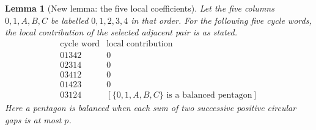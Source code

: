 \documentclass[11pt,oneside]{report}
\newtheorem{lemma}[theorem]{Lemma}
\theoremstyle{definition}
\numberwithin{equation}{section}
\begin{document}
\begin{lemma}[New lemma: the five local coefficients]
\label{J21:lem:m4-B-unit-table}
Let the five columns $0,1,A,B,C$ be labelled $0,1,2,3,4$ in that
order. For the following five cycle words, the local contribution of
the selected adjacent pair is as stated.
\[
\begin{array}{c|c}
 \text{cycle word}&\text{local contribution}\\\hline
 01342&0\\
 02314&0\\
 03412&0\\
 01423&0\\
 03124&[\{0,1,A,B,C\}\text{ is a balanced pentagon}]
\end{array}
\]
Here a pentagon is balanced when each sum of two successive positive
circular gaps is at most $p$.
\end{lemma}
\end{document}
